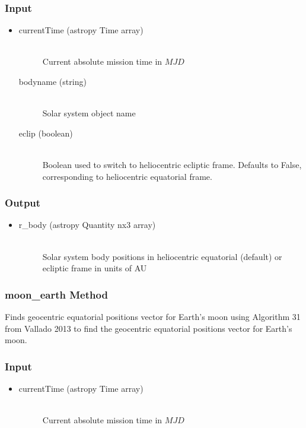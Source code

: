 \documentclass[cleanfoot]{asme2ej}
\begin{document}
\subsubsection*{Input}
\begin{itemize}
\item
\begin{description}
    \item[currentTime (astropy Time array)] \hfill \\ Current absolute mission time in $MJD$
    \item[bodyname (string)] \hfill \\ Solar system object name
    \item[eclip (boolean)] \hfill \\ Boolean used to switch to heliocentric ecliptic frame. Defaults to False, corresponding to heliocentric equatorial frame.
\end{description}
\end{itemize}
\subsubsection*{Output}
\begin{itemize}
\item
\begin{description}
    \item[r\_body (astropy Quantity nx3 array)] \hfill \\ Solar system body positions in heliocentric equatorial (default) or ecliptic frame in units of AU
\end{description}
\end{itemize}

\subsubsection{moon\_earth Method} \label{}
Finds geocentric equatorial positions vector for Earth's moon using Algorithm 31 from Vallado 2013 to find the geocentric equatorial positions vector for Earth's moon.
\subsubsection*{Input}
\begin{itemize}
\item
\begin{description}
    \item[currentTime (astropy Time array)] \hfill \\ Current absolute mission time in $MJD$
\end{description}
\end{itemize}
\end{document}
